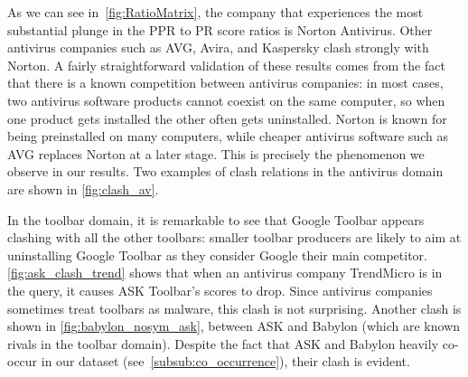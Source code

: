 \documentclass[ijoc,nonblindrev]{informs3} %
\numberwithin{equation}{subsection}
\begin{document}
As we can see in~\autoref{fig:RatioMatrix}, the company that experiences the most substantial plunge in the PPR to PR score ratios is Norton Antivirus. Other antivirus companies such as AVG, Avira, and Kaspersky clash strongly with Norton. A fairly straightforward validation of these results comes from the fact that there is a known competition between antivirus companies: in most cases, two antivirus software products cannot coexist on the same computer, so when one product gets installed the other often gets uninstalled. Norton is known for being preinstalled on many computers, while cheaper antivirus software such as AVG replaces Norton at a later stage. This is precisely the phenomenon we observe in our results. Two examples of clash relations in the antivirus domain are shown in \autoref{fig:clash_av}.

In the toolbar domain, it is remarkable to see that Google Toolbar appears clashing with all the other toolbars: smaller toolbar producers are likely to aim at uninstalling Google Toolbar as they consider Google their main competitor. \autoref{fig:ask_clash_trend} shows that when an antivirus company TrendMicro is in the query, it causes ASK Toolbar's scores to drop. Since antivirus companies sometimes treat toolbars as malware, this clash is not surprising. Another clash is shown in \autoref{fig:babylon_nosym_ask}, between ASK and Babylon (which are known rivals in the toolbar domain). Despite the fact that ASK and Babylon heavily co-occur in our dataset (see~\autoref{subsub:co_occurrence}), their clash is evident.
\end{document}

